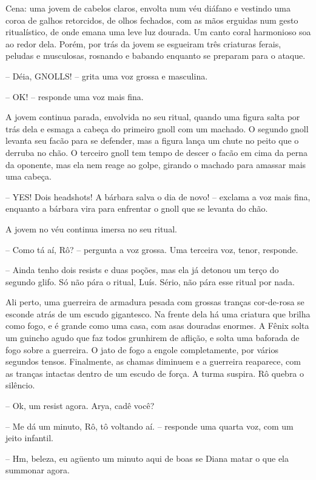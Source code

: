 

Cena: uma jovem de cabelos claros, envolta num véu diáfano e vestindo uma coroa de galhos retorcidos,
de olhos fechados, com as mãos erguidas num gesto ritualístico, de onde emana uma leve luz dourada.
Um canto coral harmonioso soa ao redor dela. Porém, por trás da jovem se esgueiram três criaturas
ferais, peludas e musculosas, rosnando e babando enquanto se preparam para o ataque.

-- Déia, GNOLLS! -- grita uma voz grossa e masculina.

-- OK! -- responde uma voz mais fina.

A jovem continua parada, envolvida no seu ritual, quando uma figura salta por trás dela e esmaga a cabeça do primeiro gnoll
com um machado. O segundo gnoll levanta seu facão para se defender, mas a figura lança um chute no peito que o derruba no chão.
O terceiro gnoll tem tempo de descer o facão em cima da perna da oponente, mas ela nem reage ao golpe, girando o machado para
amassar mais uma cabeça. 

-- YES! Dois headshots! A bárbara salva o dia de novo! -- exclama a voz mais fina, enquanto a bárbara vira para enfrentar o gnoll que se levanta do chão.

A jovem no véu continua imersa no seu ritual.

-- Como tá aí, Rô? -- pergunta a voz grossa. Uma terceira voz, tenor, responde.

-- Ainda tenho dois resists e duas poções, mas ela já detonou um terço do segundo glifo. 
Só não pára o ritual, Luís. Sério, não pára esse ritual por nada.

Ali perto, uma guerreira de armadura pesada com grossas tranças cor-de-rosa se esconde atrás de um escudo gigantesco. 
Na frente dela há uma criatura que brilha como fogo, e é grande como uma casa, com asas douradas enormes.
A Fênix solta um guincho agudo que faz todos grunhirem de aflição, e solta uma baforada de fogo sobre a guerreira.
O jato de fogo a engole completamente, por vários segundos tensos. Finalmente, as chamas diminuem e a guerreira reaparece,
com as tranças intactas dentro de um escudo de força. A turma suspira. Rô quebra o silêncio.

-- Ok, um resist agora. Arya, cadê você?

-- Me dá um minuto, Rô, tô voltando aí. -- responde uma quarta voz, com um jeito infantil.

-- Hm, beleza, eu agüento um minuto aqui de boas se Diana matar o que ela summonar agora.


